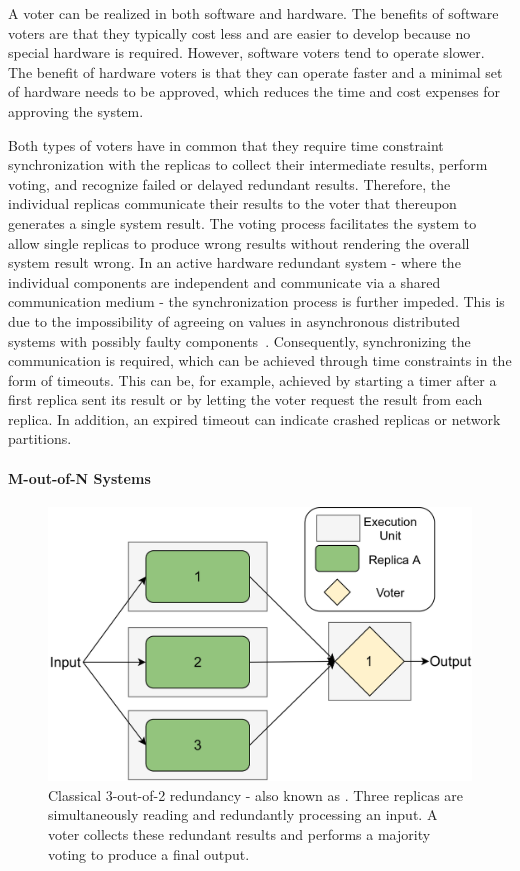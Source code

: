A voter can be realized in both software and hardware.
The benefits of software voters are that they typically cost less and are easier to develop because no special hardware is required.
However, software voters tend to operate slower.
The benefit of hardware voters is that they can operate faster and a minimal set of hardware needs to be approved, which reduces the time and cost expenses for approving the system.

Both types of voters have in common that they require time constraint synchronization with the replicas to collect their intermediate results, perform voting, and recognize failed or delayed redundant results.
Therefore, the individual replicas communicate their results to the voter that thereupon generates a single system result.
The voting process facilitates the system to allow single replicas to produce wrong results without rendering the overall system result wrong.
In an active hardware redundant system - where the individual components are independent and communicate via a shared communication medium - the synchronization process is further impeded.
This is due to the impossibility of agreeing on values in asynchronous distributed systems with possibly faulty components~\cite{FLPProblemConsensus}.
Consequently, synchronizing the communication is required, which can be achieved through time constraints in the form of timeouts.
This can be, for example, achieved by starting a timer after a first replica sent its result or by letting the voter request the result from each replica.
In addition, an expired timeout can indicate crashed replicas or network partitions.

\paragraph{M-out-of-N Systems}
\begin{figure}[!hb]
	\centering
	\includegraphics[width=0.8\linewidth]{images/Classical2OO3}
	\caption{Classical 3-out-of-2 redundancy - also known as . Three replicas are simultaneously reading and redundantly processing an input. A voter collects these redundant results and performs a majority voting to produce a final output.}
	\label{fig:Classical2OO3}
\end{figure}

